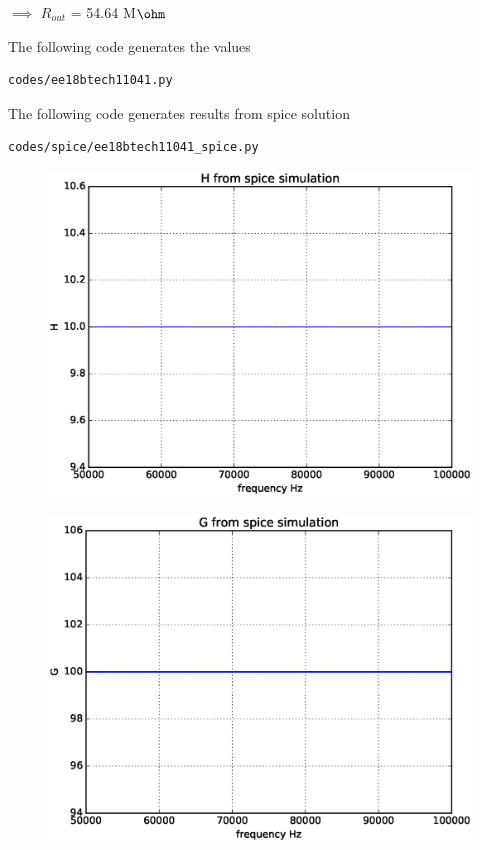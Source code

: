 \begin{enumerate}[label=\arabic*.,ref=\theenumi]
$\implies$  $R_{out}$ = 54.64 M$\ohm$


\begin{table}[!ht]
\centering

\caption{}
\label{table: Output_Table}
\end{table}
    
The following code generates the values
\begin{lstlisting}
codes/ee18btech11041.py
\end{lstlisting}

The following code generates results from spice solution

\begin{lstlisting}
codes/spice/ee18btech11041_spice.py
\end{lstlisting}

\begin{figure}[!ht]
\centering
\includegraphics[width=\columnwidth]{./figs/H1.eps}
\caption{}
\label{fig:fig4}
\end{figure}


\begin{figure}[!ht]
\centering
\includegraphics[width=\columnwidth]{./figs/G1.eps}
\caption{}
\label{fig:fig5}
\end{figure}



\end{enumerate}
